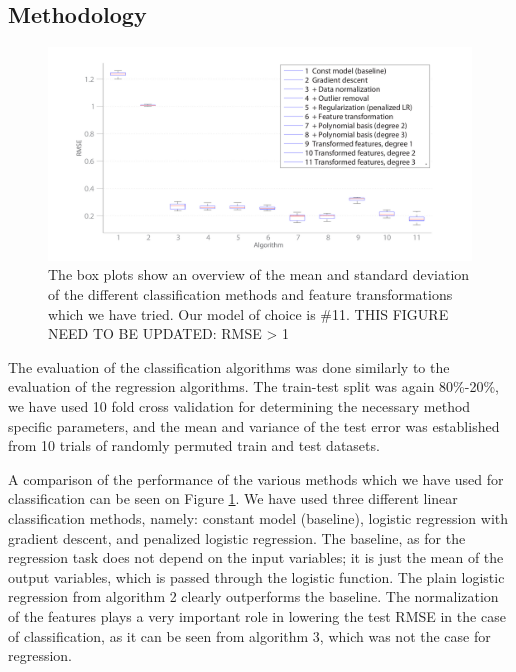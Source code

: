 \documentclass{article} %
\begin{document}
\subsection{Methodology}

\begin{figure}[t!]
	\center
	\includegraphics[trim=25mm 10mm 35mm 15mm, clip=true, width=1\columnwidth]{figures/ClassificationHist2.pdf}
	\caption{The box plots show an overview of the mean and standard deviation of the different classification methods and feature transformations which we have tried. Our model of choice is \#11. THIS FIGURE NEED TO BE UPDATED: RMSE > 1}
	\label{fig:ClassificationHist}
\end{figure}

The evaluation of the classification algorithms was done similarly to the evaluation of the regression algorithms. The train-test split was again 80\%-20\%, we have used 10 fold cross validation for determining the necessary method specific parameters, and the mean and variance of the test error was established from 10 trials of randomly permuted train and test datasets.

A comparison of the performance of the various methods which we have used for classification can be seen on Figure \ref{fig:ClassificationHist}. We have used three different linear classification methods, namely: constant model (baseline), logistic regression with gradient descent, and penalized logistic regression. The baseline, as for the regression task does not depend on the input variables; it is just the mean of the output variables, which is passed through the logistic function. The plain logistic regression from algorithm 2 clearly outperforms the baseline. The normalization of the features plays a very important role in lowering the test RMSE in the case of classification, as it can be seen from algorithm 3, which was not the case for regression.
\end{document}

